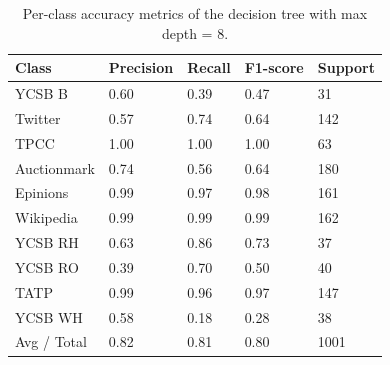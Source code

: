 \begin{table}[h!]
  \centering
  \begin{tabular}{l|llll}
    \toprule
    Class            & Precision & Recall & F1-score & Support \\
    \midrule
    YCSB B    & 0.60      & 0.39   & 0.47     & 31      \\
    Twitter          & 0.57      & 0.74   & 0.64     & 142     \\
    TPCC             & 1.00      & 1.00   & 1.00     & 63      \\
    Auctionmark      & 0.74      & 0.56   & 0.64     & 180     \\
    Epinions         & 0.99      & 0.97   & 0.98     & 161     \\
    Wikipedia        & 0.99      & 0.99   & 0.99     & 162     \\
    YCSB RH  & 0.63      & 0.86   & 0.73     & 37      \\
    YCSB RO   & 0.39      & 0.70   & 0.50     & 40      \\
    TATP             & 0.99      & 0.96   & 0.97     & 147     \\
    YCSB WH & 0.58      & 0.18   & 0.28     & 38      \\
    \midrule
    Avg / Total      & 0.82      & 0.81   & 0.80     & 1001    \\
   \bottomrule
  \end{tabular}
\caption{Per-class accuracy metrics of the decision tree with max depth = 8.}
\label{tab:dt_stats}
\end{table}
